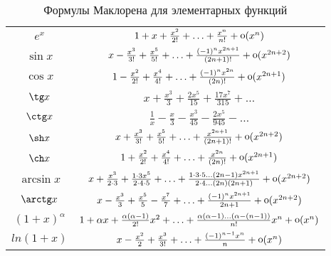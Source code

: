\begin{table}[h]
    \centering
    \caption{Формулы Маклорена для элементарных функций}

    \begin{tabular}{c|c}
    \phantom{$\dfrac{42}{42}$} $e^x$ & $1 + x + \frac{x^2}{2 !} + \ldots + \frac{x^n}{n !} + \mathop{\mathrm{o}}\nolimits (x^n)$ \\

    \phantom{$\dfrac{42}{42}$}$\sin x$ & $x - \frac{x^3}{3!} + \frac{x^5}{5 !} + \ldots + \frac{(-1)^n x^{2n+1}}{(2n + 1) !} + \mathop{\mathrm{o}}\nolimits(x^{2n+2})$ \\
    
    \phantom{$\dfrac{42}{42}$}$\cos x$ & $1 - \frac{x^2}{2 !} + \frac{x^4}{4 !} + \ldots + \frac{(-1)^n x^{2n}}{(2n)!} + \mathop{\mathrm{o}}\nolimits(x^{2n+1})$ \\

    \phantom{$\dfrac{42}{42}$}$\tg x$& $x + \frac{x^3}{3} + \frac{2x^5}{15} + \frac{17 x^7}{315} + \ldots$ \\

    \phantom{$\dfrac{42}{42}$} $\ctg x$& $\frac{1}{x} - \frac{x}{3} - \frac{x^3}{45} - \frac{2x^5}{945} - \ldots$ \\    
    
    \phantom{$\dfrac{42}{42}$}$\sh x$ & $x + \frac{x^3}{3 !} + \frac{x^5}{5 !} + \ldots + \frac{x^{2n+1}}{(2n + 1) !} + \mathop{\mathrm{o}}\nolimits(x^{2n+2})$ \\
    
    \phantom{$\dfrac{42}{42}$}$\ch x$ & $1 + \frac{x^2}{2 !} + \frac{x^4}{4 !} + \ldots + \frac{x^{2n}}{(2n)!} + \mathop{\mathrm{o}}\nolimits(x^{2n+1})$\\

    \phantom{$\dfrac{42}{42}$} $\arcsin x$ & $x + \frac{x^3}{2 \cdot 3} + \frac{1 \cdot 3 x^5}{2 \cdot 4 \cdot 5} + \ldots + \frac{1 \cdot 3 \cdot 5 \ldots (2n -1) x^{2n+1}}{2 \cdot 4 \ldots (2n)(2n+1)} + \mathop{\mathrm{o}}\nolimits(x^{2n+2})$ \\

    \phantom{$\dfrac{42}{42}$}$\arctg x$ & $x - \frac{x^3}{3} + \frac{x^5}{5} - \frac{x^7}{7} + \ldots + \frac{(-1)^n x^{2n+1}}{2n+1} + \mathop{\mathrm{o}}\nolimits (x^{2n+2})$ \\
    
    \phantom{$\dfrac{42}{42}$}$(1 + x)^\alpha$ & $1 + \alpha x + \frac{\alpha (\alpha - 1) }{2 !}x^2 + \ldots + \frac{\alpha (\alpha - 1) \ldots (\alpha - (n-1))}{n!}x^n + \mathop{\mathrm{o}}\nolimits(x^n)$ \\

    \phantom{$\dfrac{42}{42}$}$ln(1 + x)$ & $x - \frac{x^2}{2} + \frac{x^3}{3 !} + \ldots + \frac{(-1)^{n-1} x^n}{n} + \mathop{\mathrm{o}}\nolimits(x^n)$ \\
    \end{tabular}
\end{table}

